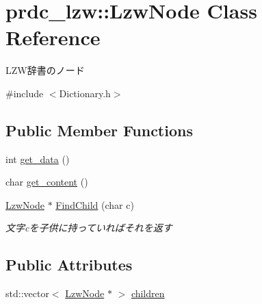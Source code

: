 \hypertarget{classprdc__lzw_1_1LzwNode}{\section{prdc\-\_\-lzw\-:\-:Lzw\-Node Class Reference}
\label{classprdc__lzw_1_1LzwNode}
}


L\-Z\-W辞書のノード  




{\ttfamily \#include $<$Dictionary.\-h$>$}

\subsection*{Public Member Functions}
\begin{DoxyCompactItemize}
\item 
int \hyperlink{classprdc__lzw_1_1LzwNode_a43acbf6c83a319186feb5ff239e6714d}{get\-\_\-data} ()
\item 
char \hyperlink{classprdc__lzw_1_1LzwNode_afb7e80f3c9f742548fa9e82b4236ae36}{get\-\_\-content} ()
\item 
\hyperlink{classprdc__lzw_1_1LzwNode}{Lzw\-Node} $\ast$ \hyperlink{classprdc__lzw_1_1LzwNode_a4dbccb5fb97eae6f622a66a53eda46a3}{Find\-Child} (char c)
\begin{DoxyCompactList}\small\item\em 文字cを子供に持っていればそれを返す \end{DoxyCompactList}\end{DoxyCompactItemize}
\subsection*{Public Attributes}
\begin{DoxyCompactItemize}
\item 
std\-::vector$<$ \hyperlink{classprdc__lzw_1_1LzwNode}{Lzw\-Node} $\ast$ $>$ \hyperlink{classprdc__lzw_1_1LzwNode_abc56c04f0b0f97baf8e2b3f08d736463}{children}
\end{DoxyCompactItemize}
